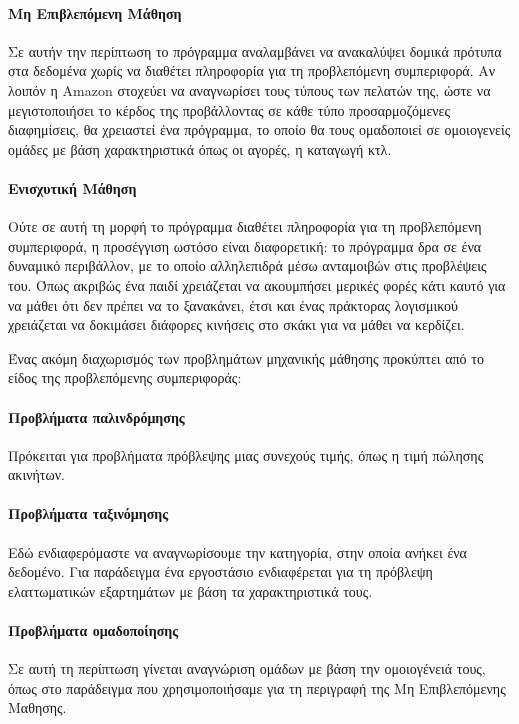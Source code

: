 \paragraph{Μη Επιβλεπόμενη Μάθηση} Σε αυτήν την περίπτωση το πρόγραμμα αναλαμβάνει να ανακαλύψει δομικά πρότυπα στα δεδομένα χωρίς να διαθέτει πληροφορία για τη προβλεπόμενη συμπεριφορά. Αν λοιπόν η Amazon στοχεύει να αναγνωρίσει τους τύπους των πελατών της, ώστε να μεγιστοποιήσει το κέρδος της προβάλλοντας σε κάθε τύπο προσαρμοζόμενες διαφημίσεις, θα χρειαστεί ένα πρόγραμμα, το οποίο θα τους ομαδοποιεί σε ομοιογενείς ομάδες με βάση χαρακτηριστικά όπως οι αγορές, η καταγωγή κτλ.

\paragraph{Ενισχυτική Μάθηση} Ούτε σε αυτή τη μορφή το πρόγραμμα διαθέτει πληροφορία για τη προβλεπόμενη συμπεριφορά, η προσέγγιση ωστόσο είναι διαφορετική: το πρόγραμμα δρα σε ένα δυναμικό περιβάλλον, με το οποίο αλληλεπιδρά μέσω ανταμοιβών στις προβλέψεις του. Όπως ακριβώς ένα παιδί χρειάζεται να ακουμπήσει μερικές φορές κάτι καυτό για να μάθει ότι δεν πρέπει να το ξανακάνει, έτσι και ένας πράκτορας λογισμικού χρειάζεται να δοκιμάσει διάφορες κινήσεις στο σκάκι για να μάθει να κερδίζει.

Ένας ακόμη διαχωρισμός των προβλημάτων μηχανικής μάθησης προκύπτει από το είδος της προβλεπόμενης συμπεριφοράς:

\paragraph{Προβλήματα παλινδρόμησης} Πρόκειται για προβλήματα πρόβλεψης μιας συνεχούς τιμής, όπως η τιμή πώλησης ακινήτων.
\paragraph{Προβλήματα ταξινόμησης} Εδώ ενδιαφερόμαστε να αναγνωρίσουμε την κατηγορία, στην οποία ανήκει ένα δεδομένο. Για παράδειγμα ένα εργοστάσιο ενδιαφέρεται για τη πρόβλεψη ελαττωματικών εξαρτημάτων με βάση τα χαρακτηριστικά τους.
\paragraph{Προβλήματα ομαδοποίησης} Σε αυτή τη περίπτωση γίνεται αναγνώριση ομάδων με βάση την ομοιογένειά τους, όπως στο παράδειγμα που χρησιμοποιήσαμε για τη περιγραφή της Μη Επιβλεπόμενης Μαθησης.

